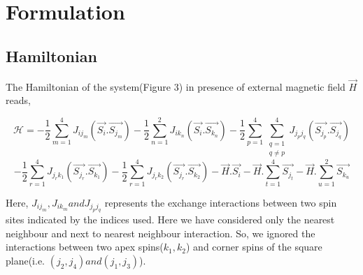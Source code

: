\documentclass[24pt]{article}
\begin{document}
\section{{\Large Formulation}}
\subsection{\large \textbf{Hamiltonian}}
\begin{large}
The Hamiltonian of the system(Figure 3) in presence of external magnetic field $\vec{H}$ reads,

$$
\mathcal{H} = - \frac{1}{2} \sum_{m=1}^{4}J_{i j_{m}} (\vec{S_i}.\vec{S_{j_m}})
- \frac{1}{2} \sum_{n=1}^{2}J_{i k_{n}} (\vec{S_i}.\vec{S_{k_n}})
- \frac{1}{2} \sum_{p=1}^{4} \sum_{\substack{q=1\\ q \neq p}}^{4}J_{j_{p} j_{q}}(\vec{S_{j_{p}}}. \vec{S_{j_{q}}})
$$
\begin{equation}
- \frac{1}{2} \sum_{r=1}^{4}J_{j_{r} k_{1}} (\vec{S_{j_r}}.\vec{S_{k_1}})
- \frac{1}{2} \sum_{r=1}^{4}J_{j_{r} k_{2}} (\vec{S_{j_r}}.\vec{S_{k_2}})
- \vec{H}.\vec{S_i} - \vec{H}. \sum_{t=1}^{4}\vec{S_{j_t}} 
-\vec{H}. \sum_{u=1}^{2}\vec{S_{k_u}}
\end{equation}


Here, $J_{i {j_m}}, J_{i k_{m}} and J_{j_p j_q}$ represents the  exchange interactions between two  spin sites indicated by the indices used. Here we have considered only the nearest neighbour and next to nearest neighbour interaction. So, we ignored the interactions between two apex spins($k_1, k_2$) and corner spins of the square plane(i.e. $(j_2,j_4) and (j_1, j_3)$).
\end{large}
\end{document}

